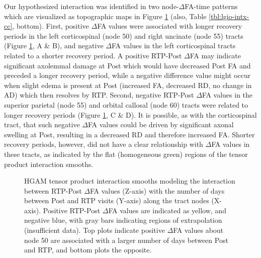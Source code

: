 \documentclass[12pt]{article}
\begin{document}
Our hypothesized interaction was identified in two node-$\Delta$FA-time patterns which are visualized as topographic maps in Figure \ref{fig:di-time} (also, Table \ref{tbl:lgio-intx-cc}, bottom). First, positive $\Delta$FA values were associated with longer recovery periods in the left corticospinal (node 50) and right uncinate (node 55) tracts (Figure \ref{fig:di-time}, A \& B), and negative $\Delta$FA values in the left corticospinal tracts related to a shorter recovery period. A positive RTP-Post $\Delta$FA may indicate significant axolemmal damage at Post which would have decreased Post FA and preceded a longer recovery period, while a negative difference value might occur when slight edema is present at Post (increased FA, decreased RD, no change in AD) which then resolves by RTP. Second, negative RTP-Post $\Delta$FA values in the superior parietal (node 55) and orbital callosal (node 60) tracts were related to longer recovery periods (Figure \ref{fig:di-time}, C \& D). It is possible, as with the corticospinal tract, that such negative $\Delta$FA values could be driven by significant axonal swelling at Post, resulting in a decreased RD and therefore increased FA. Shorter recovery periods, however, did not have a clear relationship with $\Delta$FA values in these tracts, as indicated by the flat (homogeneous green) regions of the tensor product interaction smooths.


\begin{figure}[H]
	\centering
	\caption{HGAM tensor product interaction smooths modeling the interaction between RTP-Post $\Delta$FA values (Z-axis) with the number of days between Post and RTP visits (Y-axis) along the tract nodes (X-axis). Positive RTP-Post $\Delta$FA values are indicated as yellow, and negative blue, with gray bars indicating regions of extrapolation (insufficient data). Top plots indicate positive $\Delta$FA values about node 50 are associated with a larger number of days between Post and RTP, and bottom plots the opposite.}
	\label{fig:di-time}
\end{figure}
\end{document}
